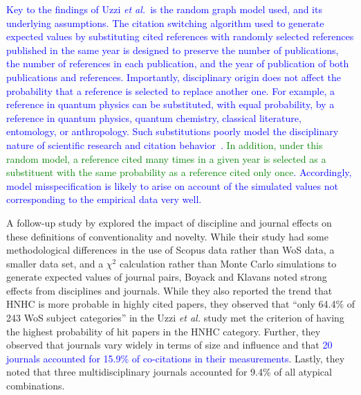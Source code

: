 \documentclass[NETN]{stjour}
\begin{document}
\textcolor{blue}{Key to the findings of Uzzi {\em et al.}~is the random graph model used, and its underlying assumptions. The citation switching algorithm used to generate expected values by substituting cited references with randomly selected references published in the same year is designed to preserve the number of publications, the number of references in each publication, and the year of publication of both publications and references. Importantly, disciplinary origin does not affect the probability that a reference is selected to replace another one. For example, a reference in quantum physics can be substituted, with equal probability, by a reference in quantum physics, quantum chemistry, classical literature, entomology, or anthropology. Such substitutions poorly model the disciplinary nature of scientific research and citation behavior~\citep{wallace_lariviere_gingras_2012,moed_measuring_2010,klavans_research_2017,garfield_1979}. \textcolor{green}{In addition, under this random model, a reference cited many times in a given year is selected as a substituent with the same probability as a reference cited only once}. Accordingly, model misspecification is likely to arise on account of the simulated values not corresponding to the empirical data very well.} 

A follow-up study by \cite{boyack_vs_uzzi_2014} explored the impact of discipline and journal effects on these definitions of conventionality and novelty.  While their study had some methodological differences in the use of Scopus data rather than WoS data, a smaller data set, and a $\chi^2$ calculation rather than Monte Carlo simulations to generate expected values of journal pairs, Boyack and Klavans noted strong effects from disciplines and journals. While they also reported the trend that HNHC is more probable in highly cited papers, they observed that ``only 64.4\%  of  243  WoS  subject  categories'' in the Uzzi {\em et al.} study met the criterion of having the highest probability of hit papers in the HNHC category.  Further, they observed that journals vary widely in terms of size and influence and that \textcolor{blue}{20 journals accounted for 15.9\% of co-citations in their measurements}. Lastly, they noted that three multidisciplinary journals accounted for 9.4\% of all atypical combinations. 
\end{document}
